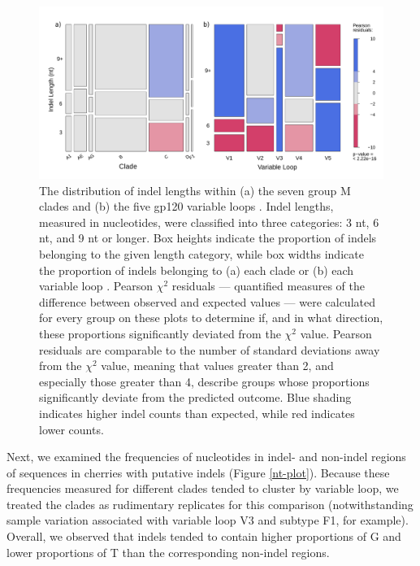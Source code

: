 \documentclass[12pt]{article}
\begin{document}
\begin{figure}[htbp]
    \centering
    \includegraphics[scale=0.37, trim={12mm 5mm 0 5mm},clip]{mosaic-combined3.pdf}
    \caption{
    The distribution of indel lengths within (a) the seven group M clades and (b) the five gp120 variable loops . 
    Indel lengths, measured in nucleotides, were classified into three categories: 3 nt, 6 nt, and 9 nt or longer. 
    Box heights indicate the proportion of indels belonging to the given length category, while box widths indicate the proportion of indels belonging to (a) each clade or (b) each variable loop .  
    Pearson $\chi^2$ residuals --- quantified measures of the difference between observed and expected values --- were calculated for every group on these plots to determine if, and in what direction, these proportions significantly deviated from the $\chi^2$ value. 
    Pearson residuals are comparable to the number of standard deviations away from the $\chi^2$ value, meaning that values greater than 2, and especially those greater than 4, describe groups whose proportions significantly deviate from the predicted outcome.
    Blue shading indicates higher indel counts than expected, while red indicates lower counts.
    }
    \label{mosaic}
\end{figure}

Next, we examined the frequencies of nucleotides in indel- and non-indel regions of sequences in cherries with putative indels (Figure \ref{nt-plot}).  
Because these frequencies measured for different clades tended to cluster by variable loop, we treated the clades as rudimentary replicates for this comparison (notwithstanding sample variation associated with variable loop V3 and subtype F1, for example).
Overall, we observed that indels tended to contain higher proportions of G and lower proportions of T than the corresponding non-indel regions.
\end{document}
